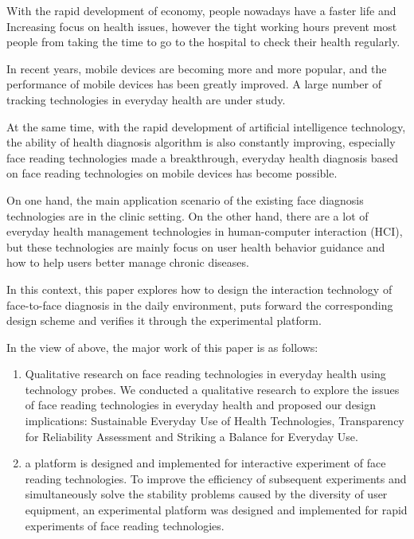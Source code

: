 \documentclass[type=master]{fduthesis}
\begin{document}
\begin{abstract*}

With the rapid development of economy, people nowadays have a faster life and Increasing focus on health issues, however the tight working hours prevent most people from taking the time to go to the hospital to check their health regularly.

In recent years, mobile devices are becoming more and more popular, and the performance of mobile devices has been greatly improved. A large number of tracking technologies in everyday health are under study.
  
At the same time, with the rapid development of artificial intelligence technology, the ability of health diagnosis algorithm is also constantly improving, especially face reading technologies made a breakthrough, everyday health diagnosis based on face reading technologies on mobile devices has become possible.
  
  
On one hand, the main application scenario of the existing face diagnosis technologies are in the clinic setting. On the other hand, there are a lot of everyday health management technologies in human-computer interaction (HCI), but these technologies are mainly focus on user health behavior guidance and how to help users better manage chronic diseases.
  
In this context, this paper explores how to design the interaction technology of face-to-face diagnosis in the daily environment, puts forward the corresponding design scheme and verifies it through the experimental platform.
  
In the view of above, the major work of this paper is as follows:
  
  \begin{enumerate}
  
  \item Qualitative research on face reading technologies in everyday health using technology probes.
We conducted a qualitative research to explore the issues of face reading technologies in everyday health and proposed our design implications: Sustainable Everyday Use of Health Technologies, Transparency for Reliability Assessment and Striking a Balance for Everyday Use.
  
  \item a platform is designed and implemented for interactive experiment of face reading technologies.
To improve the efficiency of subsequent experiments and simultaneously solve the stability problems caused by the diversity of user equipment, an experimental platform was designed and implemented for rapid experiments of face reading technologies.
  

\end{enumerate}
\end{abstract*}
\end{document}
